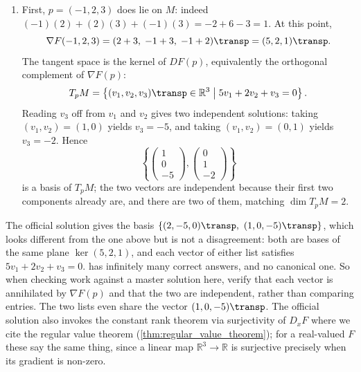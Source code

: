 \begin{exercisesolution}
\begin{enumerate}[label=\textbf{(\alph*)}]
  \item First, $p = (-1,2,3)$ does lie on $M$: indeed $(-1)(2) + (2)(3) + (-1)(3) = -2 + 6 - 3 = 1$.
    At this point,
\[\nabla F(-1,2,3) = (2+3,\; -1+3,\; -1+2)\transp = (5, 2, 1)\transp .\]
    The tangent space is the kernel of $DF(p)$, equivalently the orthogonal complement of
    $\nabla F(p)$:
\[T_p M = \left\{(v_1, v_2, v_3)\transp \in \mathbb{R}^3 \;\middle|\; 5v_1 + 2v_2 + v_3 = 0\right\}.\]
    Reading $v_3$ off from $v_1$ and $v_2$ gives two independent solutions: taking $(v_1,v_2) =
    (1,0)$ yields $v_3 = -5$, and taking $(v_1,v_2) = (0,1)$ yields $v_3 = -2$. Hence
\[\left\{\begin{pmatrix} 1 \\ 0 \\ -5 \end{pmatrix}, \begin{pmatrix} 0 \\ 1 \\ -2 \end{pmatrix}\right\}\]
    is a basis of $T_p M$; the two vectors are independent because their first two components
    already are, and there are two of them, matching $\dim T_p M = 2$.
\end{enumerate}
\begin{ainote}
The official solution gives the basis $\left\{(2,-5,0)\transp,\ (1,0,-5)\transp\right\}$, which
looks different from the one above but is not a disagreement: both are bases of the same plane
$\ker(5,2,1)$, and each vector of either list satisfies $5v_1+2v_2+v_3 = 0$.  has
infinitely many correct answers, and no canonical one. So when checking work against a master
solution here, verify that each vector is annihilated by $\nabla F(p)$ and that the two are
independent, rather than comparing entries. The two lists even share the vector $(1,0,-5)\transp$.
The official solution also invokes the constant rank theorem via surjectivity of $D_xF$ where we
cite the regular value theorem (\cref{thm:regular_value_theorem}); for a real-valued $F$ these say
the same thing, since a linear map $\mathbb{R}^3 \to \mathbb{R}$ is surjective precisely when its
gradient is non-zero.
\end{ainote}
\end{exercisesolution}

